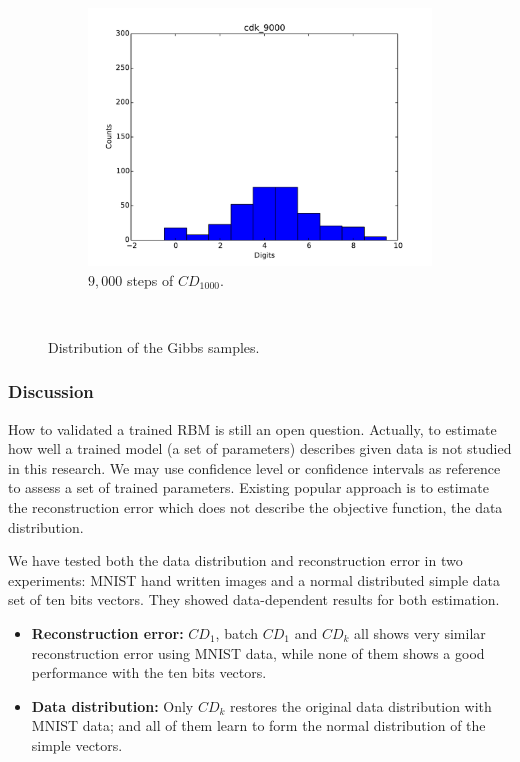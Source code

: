\begin{figure}[hbt]
\begin{subfigure}[t]{0.18\textwidth}
  			\includegraphics[width=\textwidth]{pics_sdbn/gibbs_cdk_9000.pdf}
  		    \caption{$9,000$ steps of $CD_{1000}$.}
  		\end{subfigure}\\
  \caption{
  Distribution of the Gibbs samples.
  }
  \label{Fig:vector}
\end{figure}

\subsubsection{Discussion}
	How to validated a trained RBM is still an open question.
	Actually, to estimate how well a trained model (a set of parameters) describes given data is not studied in this research.
	We may use confidence level or confidence intervals as reference to assess a set of trained parameters.
	Existing popular approach is to estimate the reconstruction error which does not describe the objective function, the data distribution.
	
	We have tested both the data distribution and reconstruction error in two experiments: MNIST hand written images and a normal distributed simple data set of ten bits vectors. 
	They showed data-dependent results for both estimation.
	\begin{itemize}
		\item \textbf{Reconstruction error:} $CD_1$, batch $CD_1$ and $CD_k$ all shows very similar reconstruction error using MNIST data, while none of them shows a good performance with the ten bits vectors.
		\item \textbf{Data distribution:} Only $CD_k$ restores the original data distribution with MNIST data; and all of them learn to form the normal distribution of the simple vectors.
	\end{itemize}
